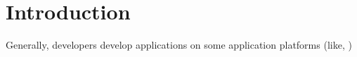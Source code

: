 \section{Introduction}

Generally, developers develop applications on some application platforms (like, )
